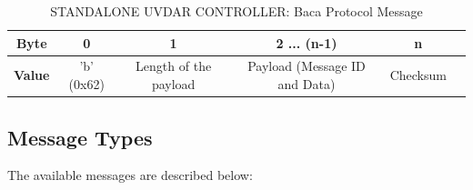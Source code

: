 \documentclass[12pt, a4paper]{article}
\begin{document}
\begin{table}[h]
\begin{tabular}{|c|c|c|c|c|c|}
\hline
\textbf{Byte}   & 0          & 1                     & 2 ... (n-1) & n        \\ \hline
\textbf{Value} & 'b' (0x62) & Length of the payload & Payload (Message ID and Data)       & Checksum \\ \hline
\end{tabular}
\caption{STANDALONE UVDAR CONTROLLER: Baca Protocol Message}
\label{tab:baca_protocol_table}
\end{table}

\subsection{Message Types}
The available messages are described below:\\
\end{document}
